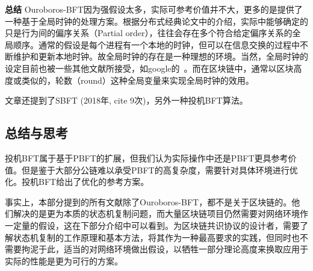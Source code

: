 \textbf{总结}
Ouroboros-BFT因为强假设太多，实际可参考价值并不大，更多的是提供了一种基于全局时钟的处理方案。根据分布式经典论文\cite{lamport1978time}中的介绍，实际中能够确定的只是行为间的偏序关系（Partial order），往往会存在多个符合给定偏序关系的全局顺序。通常的假设是每个进程有一个本地的时钟，但可以在信息交换的过程中不断维护和更新本地时钟。故全局时钟的存在是一种理想的环境。当然，全局时钟的设定目前也被一些其他文献所接受，如google的~\cite{burrows2006chubby,corbett2013spanner}。而在区块链中，通常以区块高度或类似的，轮数（round）这种全局变量来实现全局时钟的效用。

文章还提到了SBFT\cite{golan2018sbft} (2018年, cite 9次)，另外一种投机BFT算法。


\subsection{总结与思考}
投机BFT属于基于PBFT的扩展，但我们认为实际操作中还是PBFT更具参考价值。但是鉴于大部分公链难以承受PBFT的高复杂度，需要针对具体环境进行优化。投机BFT给出了优化的参考方案。

事实上，本部分提到的所有文献除了Ouroboros-BFT，都不是关于区块链的。他们解决的是更为本质的状态机复制问题，而大量区块链项目仍然需要对网络环境作一定量的假设，这在下部分介绍中可以看到。为区块链共识协议的设计者，需要了解状态机复制的工作原理和基本方法，将其作为一种最高要求的实践，但同时也不需要拘泥于此，适当的对网络环境做出假设，以牺牲一部分理论高度来换取应用于实际的性能是更为可行的方案。